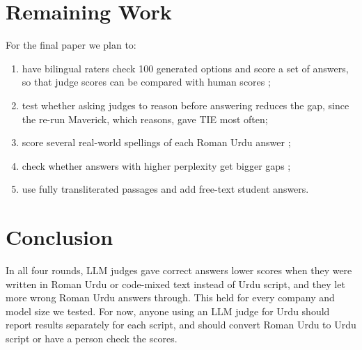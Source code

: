 \documentclass[conference]{IEEEtran}
\begin{document}
\section{Remaining Work}
\label{sec:remaining}
For the final paper we plan to:
\begin{enumerate}
\item have bilingual raters check 100 generated options and score a set of answers, so that judge scores can be
compared with human scores \cite{hada2024large};
\item test whether asking judges to reason before answering reduces the gap, since the re-run Maverick, which reasons,
gave TIE most often;
\item score several real-world spellings of each Roman Urdu answer \cite{khan2022clustering};
\item check whether answers with higher perplexity get bigger gaps \cite{wataoka2024self};
\item use fully transliterated passages and add free-text student answers.
\end{enumerate}

\section{Conclusion}
In all four rounds, LLM judges gave correct answers lower scores when they were written in Roman Urdu or code-mixed text
instead of Urdu script, and they let more wrong Roman Urdu answers through. This held for every company and model size
we tested. For now, anyone using an LLM judge for Urdu should report results separately for each script, and should
convert Roman Urdu to Urdu script or have a person check the scores.



\end{document}
